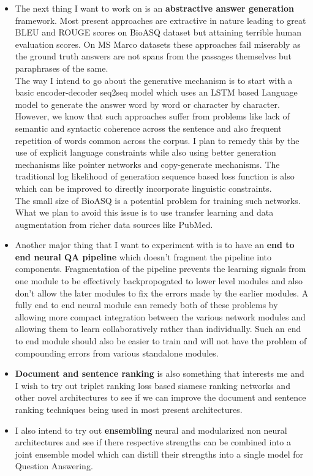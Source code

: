 \documentclass{article}
\begin{document}
\begin{itemize}
    \item The next thing I want to work on is an \textbf{abstractive answer generation} framework. Most present approaches are extractive in nature leading to great BLEU \cite{bleu} and ROUGE \cite{rouge} scores on BioASQ dataset but attaining terrible human evaluation scores. On MS Marco datasets these approaches fail miserably as the ground truth answers are not spans from the passages themselves but paraphrases of the same. \\
    The way I intend to go about the generative mechanism is to start with a basic encoder-decoder seq2seq model which uses an LSTM based Language model to generate the answer word by word or character by character. However, we know that such approaches suffer from problems like lack of semantic and syntactic coherence across the sentence and also frequent repetition of words common across the corpus. I plan to remedy this by the use of explicit language constraints while also using better generation mechanisms like pointer networks and copy-generate mechanisms. The traditional log likelihood of generation sequence based loss function is also which can be improved to directly incorporate linguistic constraints. \\ The small size of BioASQ is a potential problem for training such networks. What we plan to avoid this issue is to use transfer learning and data augmentation from richer data sources like PubMed.
    \item Another major thing that I want to experiment with is to have an \textbf{end to end neural QA pipeline} which doesn't fragment the pipeline into components. Fragmentation of the pipeline prevents the learning signals from one module to be effectively backpropogated to lower level modules and also don't allow the later modules to fix the errors made by the earlier modules. A fully end to end neural module can remedy both of these problems by allowing more compact integration between the various network modules and allowing them to learn collaboratively rather than individually. Such an end to end module should also be easier to train and will not have the problem of compounding errors from various standalone modules.
    \item \textbf{Document and sentence ranking} is also something that interests me and I wish to try out triplet ranking loss based siamese ranking networks and other novel architectures to see if we can improve the document and sentence ranking techniques being used in most present architectures. 
    \item I also intend to try out \textbf{ensembling} neural and modularized non neural architectures and see if there respective strengths can be combined into a joint ensemble model which can distill their strengths into a single model for Question Answering.
\end{itemize}
\end{document}
